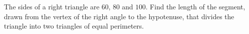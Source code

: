 The sides of a right triangle are $60$, $80$ and $100$. Find the length of the segment, drawn from the vertex of the right angle to the hypotenuse, that divides the triangle into two triangles of equal perimeters.
